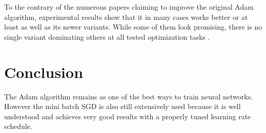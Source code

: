 \documentclass[12pt, titlepage]{article}
\begin{document}
To the contrary of the numerous papers claiming to improve the original Adam algorithm, experimental results show that it in many cases works better or at least as well as its newer variants. While some of them look promising, there is no single variant dominating others at all tested optimization tasks \cite{adam-variants}.

\section{Conclusion}

The Adam algorithm remains as one of the best ways to train neural networks. However the mini batch SGD is also still extensively used because it is well understood and achieves very good results with a properly tuned learning rate schedule.
\end{document}
